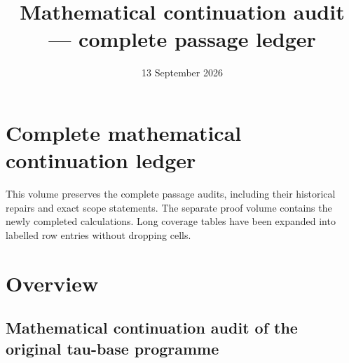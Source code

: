 \documentclass[10pt,a4paper,oneside]{report}
\renewcommand{\headrulewidth}{0.3pt}
\begin{document}
\begingroup
\setmainfont{DejaVu Serif}
\setsansfont{DejaVu Sans}
\setmonofont{DejaVu Sans Mono}
\setcounter{secnumdepth}{5}
\setcounter{tocdepth}{1}
\setlength{\parindent}{0pt}
\setlength{\parskip}{5pt plus 1pt}
\setlength{\emergencystretch}{5em}
\allowdisplaybreaks
\pagestyle{fancy}
\fancyhf{}
\fancyfoot[C]{\thepage}
\renewcommand{\headrulewidth}{0.3pt}
\setlength{\headheight}{15pt}
\makeatletter
\renewcommand{\@pnumwidth}{2.5em}
\renewcommand{\@tocrmarg}{3.5em}
\makeatother
\let\ledgermaketitle\maketitle
\renewcommand{\maketitle}{\hypersetup{pageanchor=false}\ledgermaketitle\clearpage\pagenumbering{roman}\hypersetup{pageanchor=true}}
\let\ledgertoc\tableofcontents
\renewcommand{\tableofcontents}{\ledgertoc\clearpage\pagenumbering{arabic}}
\title{Mathematical continuation audit --- complete passage ledger}
\author{}
\date{13 September 2026}

\maketitle

{
\setcounter{tocdepth}{1}
\tableofcontents
}
\chapter{Complete mathematical continuation
ledger}\label{complete-mathematical-continuation-ledger}

This volume preserves the complete passage audits, including their
historical repairs and exact scope statements. The separate proof volume
contains the newly completed calculations. Long coverage tables have
been expanded into labelled row entries without dropping cells.

\clearpage

\chapter{Overview}\label{overview}

\section{Mathematical continuation audit of the original tau-base
programme}\label{mathematical-continuation-audit-of-the-original-tau-base-programme}
\end{document}
